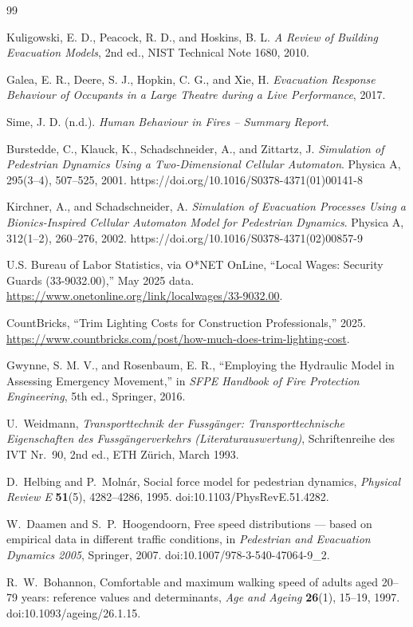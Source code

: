 \documentclass{article}
\begin{document}
\begin{thebibliography}{99}

Kuligowski, E. D., Peacock, R. D., and Hoskins, B. L.
\textit{A Review of Building Evacuation Models},
2nd ed., NIST Technical Note 1680, 2010.

Galea, E. R., Deere, S. J., Hopkin, C. G., and Xie, H.
\textit{Evacuation Response Behaviour of Occupants in
a Large Theatre during a Live Performance}, 2017.

Sime, J. D. (n.d.). \textit{Human Behaviour in Fires -- Summary Report}.

Burstedde, C., Klauck, K., Schadschneider, A., and Zittartz, J.
\textit{Simulation of Pedestrian Dynamics Using a Two-Dimensional Cellular Automaton}.
Physica A, 295(3--4), 507--525, 2001.
https://doi.org/10.1016/S0378-4371(01)00141-8

Kirchner, A., and Schadschneider, A.
\textit{Simulation of Evacuation Processes Using a Bionics-Inspired Cellular Automaton Model for Pedestrian Dynamics}.
Physica A, 312(1--2), 260--276, 2002.
https://doi.org/10.1016/S0378-4371(02)00857-9

U.S. Bureau of Labor Statistics, via O*NET OnLine,
``Local Wages: Security Guards (33-9032.00),''
May 2025 data.
\url{https://www.onetonline.org/link/localwages/33-9032.00}.

CountBricks,
``Trim Lighting Costs for Construction Professionals,''
2025.
\url{https://www.countbricks.com/post/how-much-does-trim-lighting-cost}.

Gwynne, S. M. V., and Rosenbaum, E. R.,
``Employing the Hydraulic Model in Assessing Emergency Movement,''
in \emph{SFPE Handbook of Fire Protection Engineering}, 5th ed., Springer, 2016.

U.~Weidmann,
\emph{Transporttechnik der Fussg\"anger: Transporttechnische Eigenschaften
des Fussg\"angerverkehrs (Literaturauswertung)},
Schriftenreihe des IVT Nr.~90, 2nd ed., ETH Z\"urich, March 1993.

D.~Helbing and P.~Moln\'ar,
Social force model for pedestrian dynamics,
\emph{Physical Review E} \textbf{51}(5), 4282--4286, 1995.
doi:10.1103/PhysRevE.51.4282.

W.~Daamen and S.~P.~Hoogendoorn,
Free speed distributions --- based on empirical data in different traffic
conditions,
in \emph{Pedestrian and Evacuation Dynamics 2005}, Springer, 2007.
doi:10.1007/978-3-540-47064-9\_2.

R.~W.~Bohannon,
Comfortable and maximum walking speed of adults aged 20--79 years:
reference values and determinants,
\emph{Age and Ageing} \textbf{26}(1), 15--19, 1997.
doi:10.1093/ageing/26.1.15.

\end{thebibliography}
\end{document}
